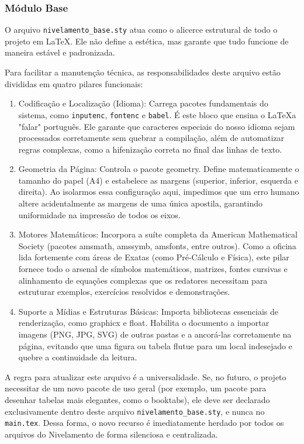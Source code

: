 \subsubsection{Módulo Base}

O arquivo \texttt{nivelamento\_base.sty} atua como o alicerce estrutural de todo o projeto em \LaTeX. Ele não define a estética, mas garante que tudo funcione de maneira estável e padronizada.

Para facilitar a manutenção técnica, as responsabilidades deste arquivo estão divididas em quatro pilares funcionais:

\begin{enumerate}
    \item Codificação e Localização (Idioma): Carrega pacotes fundamentais do sistema, como \texttt{inputenc}, \texttt{fontenc} e \texttt{babel}. É este bloco que ensina o \LaTeX a "falar" português. Ele garante que caracteres especiais do nosso idioma sejam processados corretamente sem quebrar a compilação, além de automatizar regras complexas, como a hifenização correta no final das linhas de texto.

    \item Geometria da Página: Controla o pacote geometry. Define matematicamente o tamanho do papel (A4) e estabelece as margens (superior, inferior, esquerda e direita). Ao isolarmos essa configuração aqui, impedimos que um erro humano altere acidentalmente as margens de uma única apostila, garantindo uniformidade na impressão de todos os eixos.


    \item Motores Matemáticos: Incorpora a suíte completa da American Mathematical Society (pacotes amsmath, amssymb, amsfonts, entre outros). Como a oficina lida fortemente com áreas de Exatas (como Pré-Cálculo e Física), este pilar fornece todo o arsenal de símbolos matemáticos, matrizes, fontes cursivas e alinhamento de equações complexas que os redatores necessitam para estruturar exemplos, exercícios resolvidos e demonstrações.

    \item Suporte a Mídias e Estruturas Básicas: Importa bibliotecas essenciais de renderização, como graphicx e float. Habilita o documento a importar imagens (PNG, JPG, SVG) de outras pastas e a ancorá-las corretamente na página, evitando que uma figura ou tabela flutue para um local indesejado e quebre a continuidade da leitura.
\end{enumerate}

A regra para atualizar este arquivo é a universalidade. Se, no futuro, o projeto necessitar de um novo pacote de uso geral (por exemplo, um pacote para desenhar tabelas mais elegantes, como o booktabs), ele deve ser declarado exclusivamente dentro deste arquivo \texttt{nivelamento\_base.sty}, e nunca no \texttt{main.tex}. Dessa forma, o novo recurso é imediatamente herdado por todos os arquivos do Nivelamento de forma silenciosa e centralizada.

